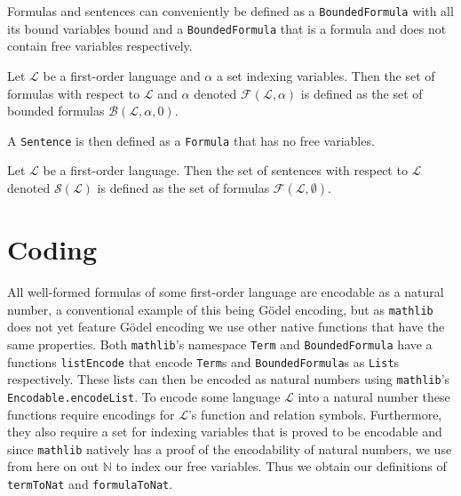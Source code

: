 Formulas and sentences can conveniently be defined as a \texttt{BoundedFormula} with all its bound variables bound and a \texttt{BoundedFormula} that is a formula and does not contain free variables respectively.

\begin{definition}\label{def:FO-Formula}
  \leanok
    Let $\mathcal{L}$ be a first-order language and $\alpha$ a set indexing variables. Then the set of formulas with respect to $\mathcal{L}$ and $\alpha$ denoted $\mathcal{F}(\mathcal{L},\alpha)$ is defined as the set of bounded formulas $\mathcal{B}(\mathcal{L},\alpha,0)$.
\end{definition}

A \texttt{Sentence} is then defined as a \texttt{Formula} that has no free variables.

\begin{definition}\label{def:FO-Sentence}
  \leanok
    Let $\mathcal{L}$ be a first-order language. Then the set of sentences with respect to $\mathcal{L}$ denoted $\mathcal{S}(\mathcal{L})$ is defined as the set of formulas $\mathcal{F}(\mathcal{L},\emptyset)$.
\end{definition}

\section{Coding}\label{subsec:coding}
All well-formed formulas of some first-order language are encodable as a natural number, a conventional example of this being Gödel encoding, but as \texttt{mathlib} does not yet feature Gödel encoding we use other native functions that have the same properties. Both \texttt{mathlib}'s namespace \texttt{Term} and \texttt{BoundedFormula} have a functions \texttt{listEncode} that encode \texttt{Term}s and \texttt{BoundedFormula}s as \texttt{List}s respectively. These lists can then be encoded as natural numbers using \texttt{mathlib}'s \texttt{Encodable.encodeList}. To encode some language $\mathcal{L}$ into a natural number these functions require encodings for $\mathcal{L}$'s function and relation symbols. Furthermore, they also require a set for indexing variables that is proved to be encodable and since \texttt{mathlib} natively has a proof of the encodability of natural numbers, we use from here on out $\mathbb{N}$ to index our free variables. Thus we obtain our definitions of \texttt{termToNat} and \texttt{formulaToNat}.

